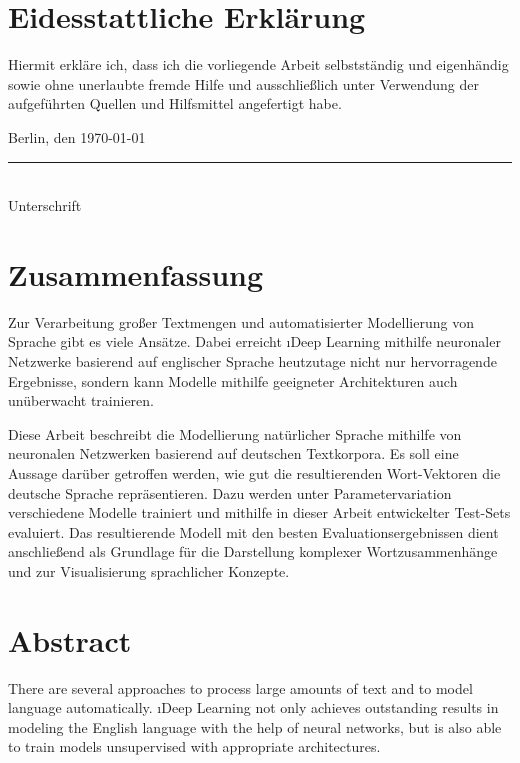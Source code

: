 \chapter*{Eidesstattliche Erklärung}
Hiermit erkläre ich, dass ich die vorliegende Arbeit selbstständig und eigenhändig sowie ohne unerlaubte fremde Hilfe und ausschließlich unter Verwendung der aufgeführten Quellen und Hilfsmittel angefertigt habe.

Berlin, den \today\\

\vspace{1cm}
\rule{.5\textwidth}{.5pt}\\
Unterschrift

\chapter*{Zusammenfassung}
Zur Verarbeitung großer Textmengen und automatisierter Modellierung von Sprache gibt es viele Ansätze. Dabei erreicht \i{Deep Learning} mithilfe neuronaler Netzwerke basierend auf englischer Sprache heutzutage nicht nur hervorragende Ergebnisse, sondern kann Modelle mithilfe geeigneter Architekturen auch unüberwacht trainieren.

Diese Arbeit beschreibt die Modellierung natürlicher Sprache mithilfe von neuronalen Netzwerken basierend auf deutschen Textkorpora. Es soll eine Aussage darüber getroffen werden, wie gut die resultierenden Wort-Vektoren die deutsche Sprache repräsentieren. Dazu werden unter Parametervariation verschiedene Modelle trainiert und mithilfe in dieser Arbeit entwickelter Test-Sets evaluiert. Das resultierende Modell mit den besten Evaluationsergebnissen dient anschließend als Grundlage für die Darstellung komplexer Wortzusammenhänge und zur Visualisierung sprachlicher Konzepte.\\


\begingroup
\renewcommand{\cleardoublepage}{}
\renewcommand{\clearpage}{}
\chapter*{Abstract}
\endgroup
There are several approaches to process large amounts of text and to model language automatically. \i{Deep Learning} not only achieves outstanding results in modeling the English language with the help of neural networks, but is also able to train models unsupervised with appropriate architectures.

